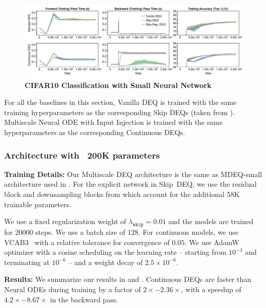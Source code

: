 \begin{figure}[t]
    \centering
    \includegraphics[width=\linewidth]{../figures/deep_equilibrium_models/cifar10_tiny.pdf}
    \caption{\textbf{CIFAR10 Classification with Small Neural Network}}
    \label{fig:cifar10_tiny}
\end{figure}


For all the baselines in this section, Vanilla DEQ is trained with the same training hyperparameters as the corresponding Skip DEQs (taken from \citet{bai_multiscale_2020}). Multiscale Neural ODE with Input Injection is trained with the same hyperparameters as the corresponding Continuous DEQs.

\subsubsection{Architecture with ~200K parameters}

% 

\textbf{Training Details:} Our Multiscale DEQ architecture is the same as MDEQ-small architecture used in \citet{bai_multiscale_2020}. For the explicit network in Skip~DEQ, we use the residual block and downsampling blocks from \citet{bai_multiscale_2020} which account for the additional 58K trainable parameters.

We use a fixed regularization weight of $\lambda_{\texttt{skip}} = 0.01$ and the models are trained for 20000 steps. We use a batch size of $128$. For continuous models, we use VCAB3~\citep{wanner1996solving} with a relative tolerance for convergence of $0.05$. We use AdamW~\citep{loshchilov2017decoupled} optimizer with a cosine scheduling on the learning rate -- starting from $10^{-3}$ and terminating at $10^{-6}$ -- and a weight decay of $2.5 \times 10^{-6}$.

\textbf{Results:} We summarize our results in  and . Continuous DEQs are faster than Neural ODEs during training by a factor of $\mathit{2\times - 2.36\times}$, with a speedup of $\mathit{4.2\times - 8.67\times}$ in the backward pass.

